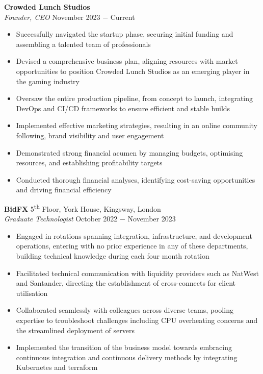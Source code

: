 \documentclass{article}
\begin{document}
\textbf{Crowded Lunch Studios}\\
\textit{Founder, CEO} \hfill November 2023 $-$ Current 
\begin{itemize}
    \item Successfully navigated the startup phase, securing initial funding and assembling a talented team of professionals
    \item Devised a comprehensive business plan, aligning resources with market opportunities to position Crowded Lunch Studios as an emerging player in the gaming industry
    \item Oversaw the entire production pipeline, from concept to launch, integrating DevOps and CI/CD frameworks to ensure efficient and stable builds
    \item Implemented effective marketing strategies, resulting in an online community following, brand visibility and user engagement
    \item Demonstrated strong financial acumen by managing budgets, optimising resources, and establishing profitability targets
    \item Conducted thorough financial analyses, identifying cost-saving opportunities and driving financial efficiency
\end{itemize} \medskip

\textbf{BidFX} \hfill 5\textsuperscript{th} Floor, York House, Kingsway, London\\
\textit{Graduate Technologist} \hfill October 2022 $-$ November 2023
\begin{itemize}
    \item Engaged in rotations spanning integration, infrastructure, and development operations, entering with no prior experience in any of these departments, building technical knowledge during each four month rotation
    \item Facilitated technical communication with liquidity providers such as NatWest and Santander, directing the establishment of cross-connects for client utilisation
    \item Collaborated seamlessly with colleagues across diverse teams, pooling expertise to troubleshoot challenges including CPU overheating concerns and the streamlined deployment of servers 
    \item Implemented the transition of the business model towards embracing continuous integration and continuous delivery methods by integrating Kubernetes and terraform
\end{itemize} \medskip
\end{document}
